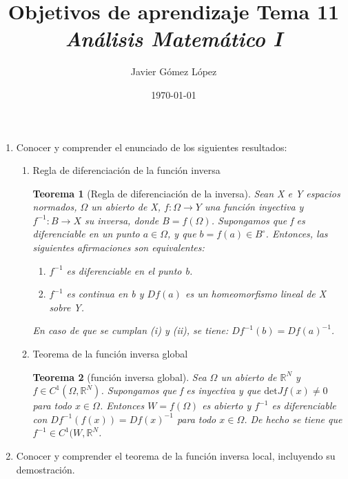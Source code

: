 \documentclass[a4paper, 12pt]{article}
\title{\textbf{Objetivos de aprendizaje Tema 11} \\ \textit{Análisis Matemático I}}
\author{Javier Gómez López}
\date{\today}
\newtheorem{teorema}{Teorema}
\begin{document}
\maketitle

\begin{enumerate}[label=\textbf{\arabic*}.]

\item Conocer y comprender el enunciado de los siguientes resultados:

\begin{enumerate}
	\item Regla de diferenciación de la función inversa
	
	\begin{teorema}[Regla de diferenciación de la inversa]
	Sean X e Y espacios normados, \(\Omega\) un abierto de X, \(f: \Omega \to Y\) una función inyectiva y \(f^{-1}: B \to X\) su inversa, donde \(B = f(\Omega)\). Supongamos que f es diferenciable en un punto \(a \in \Omega\), y que \(b = f(a) \in B^{\circ}\). Entonces, las siguientes afirmaciones son equivalentes:
	\begin{enumerate}[label=(\textit{\roman*})]
		\item \(f^{-1}\) es diferenciable en el punto b.
		\item \(f^{-1}\) es continua en b y \(Df(a)\) es un homeomorfismo lineal de X sobre Y.
	\end{enumerate}
	
	En caso de que se cumplan (i) y (ii), se tiene: \(Df^{-1} (b) = Df(a)^{-1}\).
	\end{teorema}
	
	\item Teorema de la función inversa global
	
	\begin{teorema}[función inversa global]
	Sea \(\Omega\) un abierto de \(\mathbb{R}^N\) y \(f \in C^1 (\Omega, \mathbb{R}^N)\). Supongamos que f es inyectiva y que \(\text{det}Jf(x) \neq 0\) para todo \(x \in \Omega\). Entonces \(W = f(\Omega)\) es abierto y \(f^{-1}\) es diferenciable con \(Df^{-1}(f(x)) = Df(x)^{-1}\) para todo \(x \in \Omega\). De hecho se tiene que \(f^{-1} \in C^1 (W, \mathbb{R}^N\).
	\end{teorema}
\end{enumerate}

\bigskip

\item Conocer y comprender el teorema de la función inversa local, incluyendo su demostración.


\end{enumerate}
\end{document}
